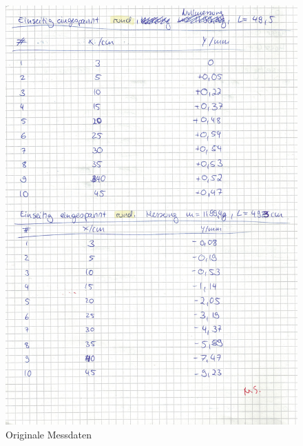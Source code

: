 \begin{figure}
  \centering
  \includegraphics[width=\textwidth]{OMD3.pdf}
  \caption{Originale Messdaten}
  \label{OMD3}
\end{figure}

